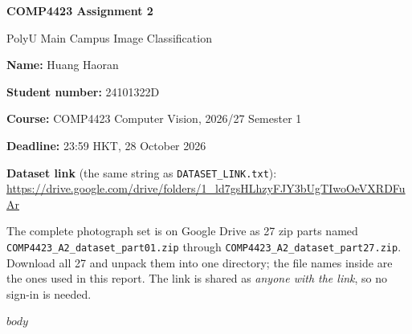 \documentclass[11pt,a4paper]{article}
\newcommand{\reporttitle}{COMP4423 Assignment 2}
\newcommand{\reportsubtitle}{PolyU Main Campus Image Classification}
\newcommand{\studentname}{Huang Haoran}
\newcommand{\studentnumber}{24101322D}
\newcommand{\dataseturl}{https://drive.google.com/drive/folders/1\_ld7gsHLhzyFJY3bUgTIwoOeVXRDFuAr}
\begin{document}
\begin{titlepage}
\vspace*{3.2cm}
\begin{center}
{\LARGE\bfseries \reporttitle\par}
\vspace{0.7cm}
{\Large \reportsubtitle\par}
\vspace{1.6cm}
{\large \textbf{Name:} \studentname\par}
\vspace{0.2cm}
{\large \textbf{Student number:} \studentnumber\par}
\vspace{0.2cm}
{\large \textbf{Course:} COMP4423 Computer Vision, 2026/27 Semester 1\par}
\vspace{0.2cm}
{\large \textbf{Deadline:} 23:59 HKT, 28 October 2026\par}
\vspace{1.4cm}
\begin{minipage}{0.86\textwidth}\small
\textbf{Dataset link} (the same string as \texttt{DATASET\_LINK.txt}):\\
\url{\dataseturl}
\end{minipage}
\vspace{1.0cm}
\begin{minipage}{0.86\textwidth}\small
The complete photograph set is on Google Drive as 27 zip parts named
\texttt{COMP4423\_A2\_dataset\_part01.zip} through
\texttt{COMP4423\_A2\_dataset\_part27.zip}. Download all 27 and unpack them
into one directory; the file names inside are the ones used in this report.
The link is shared as \emph{anyone with the link}, so no sign-in is needed.
\end{minipage}
\end{center}
\vfill
\end{titlepage}

\setcounter{page}{1}
$body$
\end{document}
